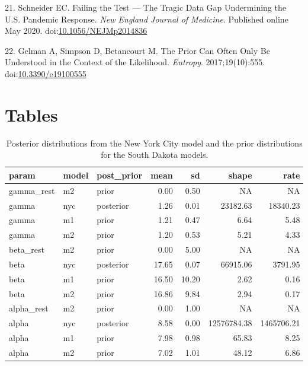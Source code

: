\documentclass[
]{article}
\begin{document}
\leavevmode\hypertarget{ref-schneider_failing_2020}{}%
21. Schneider EC. Failing the Test --- The Tragic Data Gap Undermining the U.S. Pandemic Response. \emph{New England Journal of Medicine}. Published online May 2020. doi:\href{https://doi.org/10.1056/NEJMp2014836}{10.1056/NEJMp2014836}

\leavevmode\hypertarget{ref-gelman_prior_2017}{}%
22. Gelman A, Simpson D, Betancourt M. The Prior Can Often Only Be Understood in the Context of the Likelihood. \emph{Entropy}. 2017;19(10):555. doi:\href{https://doi.org/10.3390/e19100555}{10.3390/e19100555}

\hypertarget{tables}{%
\section{Tables}\label{tables}}

\begin{table}[!h]

\caption{\label{tab:unnamed-chunk-1}Posterior distributions from the New York City model and the prior distributions for the South Dakota models.}
\centering
\begin{tabular}[t]{lllrrrr}
\toprule
param & model & post\_prior & mean & sd & shape & rate\\
\midrule
\rowcolor{gray!6}  gamma\_rest & m2 & prior & 0.00 & 0.50 & NA & NA\\
gamma & nyc & posterior & 1.26 & 0.01 & 23182.63 & 18340.23\\
\rowcolor{gray!6}  gamma & m1 & prior & 1.21 & 0.47 & 6.64 & 5.48\\
gamma & m2 & prior & 1.20 & 0.53 & 5.21 & 4.33\\
\rowcolor{gray!6}  beta\_rest & m2 & prior & 0.00 & 5.00 & NA & NA\\
\addlinespace
beta & nyc & posterior & 17.65 & 0.07 & 66915.06 & 3791.95\\
\rowcolor{gray!6}  beta & m1 & prior & 16.50 & 10.20 & 2.62 & 0.16\\
beta & m2 & prior & 16.86 & 9.84 & 2.94 & 0.17\\
\rowcolor{gray!6}  alpha\_rest & m2 & prior & 0.00 & 1.00 & NA & NA\\
alpha & nyc & posterior & 8.58 & 0.00 & 12576784.38 & 1465706.21\\
\addlinespace
\rowcolor{gray!6}  alpha & m1 & prior & 7.98 & 0.98 & 65.83 & 8.25\\
alpha & m2 & prior & 7.02 & 1.01 & 48.12 & 6.86\\
\bottomrule
\end{tabular}
\end{table}
\end{document}

